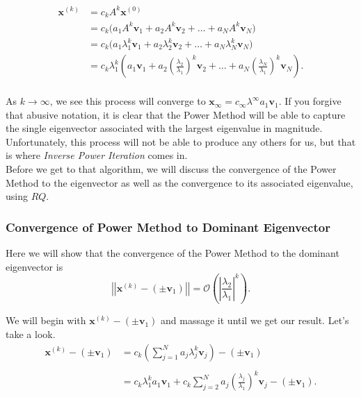 \documentclass[paper=a4, fontsize=11pt]{scrartcl} %
\numberwithin{equation}{section} %
\numberwithin{figure}{section} %
\numberwithin{table}{section} %
\begin{document}
\begin{align*}
\textbf{x}^{(k)} &= c_k A^k \textbf{x}^{(0)} \\
	&= c_k \Big( a_1 A^k \textbf{v}_1 + a_2 A^k \textbf{v}_2 +\ldots +  a_N A^k \textbf{v}_N  \Big) \\
	&= c_k \Big( a_1 \lambda_1^k \textbf{v}_1 + a_2 \lambda_2^k \textbf{v}_2  +\ldots+ a_N \lambda_N^k \textbf{v}_N   \Big)\\
	&= c_k \lambda_1^k \left(  a_1 \textbf{v}_1 + a_2\left( \frac{\lambda_2}{\lambda_1}  \right)^k \textbf{v}_2 +\ldots+  a_N\left( \frac{\lambda_N}{\lambda_1}  \right)^k \textbf{v}_N    \right). \\
\end{align*}

As $k\rightarrow\infty$, we see this process will converge to $\textbf{x}_{\infty} = c_{\infty} \lambda^{\infty} a_1 \textbf{v}_1$. If you forgive that abusive notation, it is clear that the Power Method will be able to capture the single eigenvector associated with the largest eigenvalue in magnitude. Unfortunately, this process will not be able to produce any others for us, but that is where \emph{Inverse Power Iteration} comes in. \\

Before we get to that algorithm, we will discuss the convergence of the Power Method to the eigenvector as well as the convergence to its associated eigenvalue, using $RQ$.

%
%
\subsubsection{Convergence of Power Method to Dominant Eigenvector}

 Here we will show that the convergence of the Power Method to the dominant eigenvector is $$\left|\left| \textbf{x}^{(k)} - (\pm \textbf{v}_1) \right| \right| = \mathcal{O}\left( \left| \frac{\lambda_2}{\lambda_1}  \right|^k  \right).$$
 
We will begin with $\textbf{x}^{(k)} - (\pm \textbf{v}_1)$ and massage it until we get our result. Let's take a look.
\begin{align*}
\textbf{x}^{(k)} - (\pm \textbf{v}_1) &= c_k \left( \sum_{j=1}^N a_j \lambda_j^k \textbf{v}_j \right) - (\pm \textbf{v}_1) \\ \\
 	&= c_k \lambda_1^k a_1 \textbf{v}_1 + c_k \sum_{j=2}^N a_j \left( \frac{ \lambda_j}{\lambda_1} \right)^k \textbf{v}_j - (\pm \textbf{v}_1). \\
\end{align*}
\end{document}

